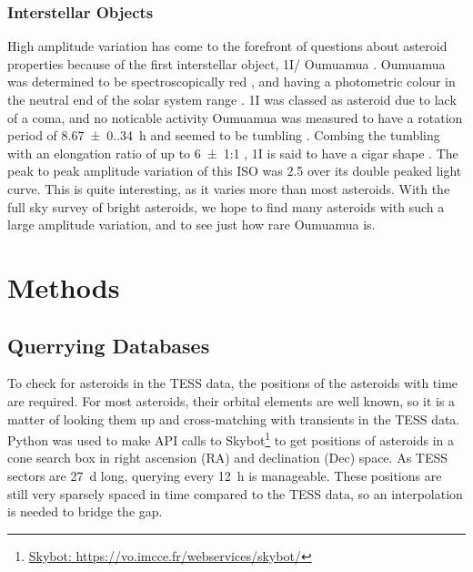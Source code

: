 \documentclass[12pt]{article}
\DeclareRobustCommand{\okina}{%
  \raisebox{\dimexpr\fontcharht\font`A-\height}{%
    \scalebox{0.8}{`}%
  }%
}
\newcommand{\omuamua}{\okina Oumuamua }
\begin{document}
\subsubsection*{Interstellar Objects}
High amplitude variation has come to the forefront of questions about asteroid properties because of the first interstellar object, 1I/\omuamua \citep[see][for a review]{Bannister2019}.
\omuamua was determined to be spectroscopically red \citep{Fitzsimmons2017, Meech2017}, and having a photometric colour in the neutral end of the solar system range \citep{Bannister2017}.  
1I was classed as asteroid due to lack of a coma, and no noticable activity %
\omuamua was measured to have a rotation period of \qty{8.67(0.34)}{\hour} \citep{Belton2018} and seemed to be tumbling \citep[e.g.][]{Drahus2018,Fraser2018}. 
Combing the tumbling with an elongation ratio of up to \qty{6(1)}{}:1 \citep{McNeill2018}, 1I is said to have a cigar shape \citep{Belton2018}.  
The peak to peak amplitude variation of this ISO was \qty{2.5}{\mag} \citep{Meech2017} over its double peaked light curve.
This is quite interesting, as it varies more than most asteroids. 
With the full sky survey of bright asteroids, we hope to find many asteroids with such a large amplitude variation, and to see just how rare \omuamua is.  


\section{Methods}\label{Sec:Meth}

\subsection{Querrying Databases}\label{SubSec:Querry}

To check for asteroids in the TESS data, the positions of the asteroids with time are required.
For most asteroids, their orbital elements are well known, so it is a matter of looking them up and cross-matching with transients in the TESS data.
Python was used to make API calls to {Skybot}\footnote{\href{https://vo.imcce.fr/webservices/skybot/}{Skybot: https://vo.imcce.fr/webservices/skybot/}} to get positions of asteroids in a cone search box in right ascension (RA) and  declination (Dec) space.
As TESS sectors are \qty{27}{\day} long, querying every \qty{12}{\hour} is manageable.
These positions are still very sparsely spaced in time compared to the TESS data, so an interpolation is needed to bridge the gap.
\end{document}
